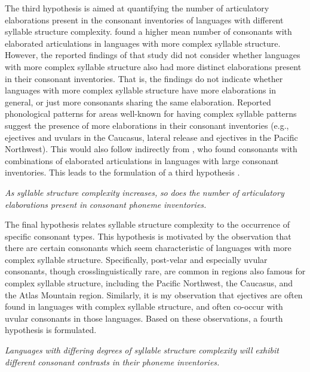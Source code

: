   The third hypothesis is aimed at quantifying the number of articulatory elaborations present in the consonant inventories of languages with different syllable structure complexity. \citet{MaddiesonEtAl2013} found a higher mean number of consonants with elaborated articulations in languages with more complex syllable structure. However, the reported findings of that study did not consider whether languages with more complex syllable structure also had more distinct elaborations present in their consonant inventories. That is, the findings do not indicate whether languages with more complex syllable structure have more elaborations in general, or just more consonants sharing the same elaboration. Reported phonological patterns for areas well-known for having complex syllable patterns suggest the presence of more elaborations in their consonant inventories (e.g., ejectives and uvulars in the Caucasus, lateral release and ejectives in the Pacific Northwest). This would also follow indirectly from \citet{LindblomMaddieson1988}, who found consonants with combinations of elaborated articulations in languages with large consonant inventories. This leads to the formulation of a third hypothesis .

\ea\label{ex:(4.4)}
  \textit{As} \textit{syllable} \textit{structure} \textit{complexity} \textit{increases,} \textit{so} \textit{does} \textit{the} \textit{number} \textit{of} \textit{articulatory} \textit{elaborations} \textit{present} \textit{in} \textit{consonant} \textit{phoneme} \textit{inventories.}
\z

  The final hypothesis relates syllable structure complexity to the occurrence of specific consonant types. This hypothesis is motivated by the observation that there are certain consonants which seem characteristic of languages with more complex syllable structure. Specifically, post-velar and especially uvular consonants, though crosslinguistically rare, are common in regions also famous for complex syllable structure, including the Pacific Northwest, the Caucasus, and the Atlas Mountain region. Similarly, it is my observation that ejectives are often found in languages with complex syllable structure, and often co-occur with uvular consonants in those languages. Based on these observations, a fourth hypothesis is formulated.

\ea\label{ex:(4.5)}
  \textit{Languages} \textit{with} \textit{differing} \textit{degrees} \textit{of} \textit{syllable} \textit{structure} \textit{complexity} \textit{will} \textit{exhibit} \textit{different} \textit{consonant} \textit{contrasts} \textit{in} \textit{their} \textit{phoneme} \textit{inventories.}
\z

